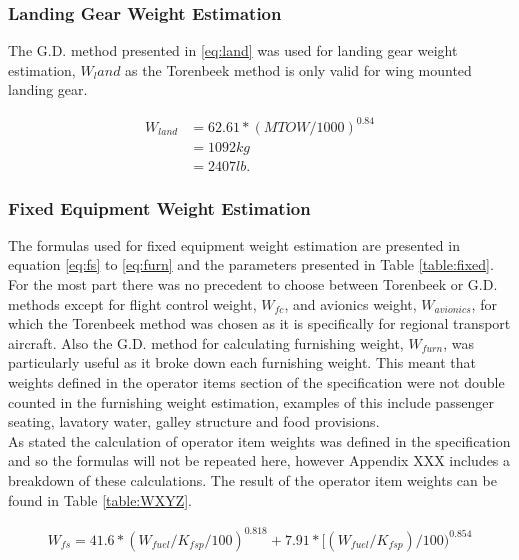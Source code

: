 \documentclass[11pt]{article}
\begin{document}
\subsubsection{Landing Gear Weight Estimation}

The G.D. method presented in \ref{eq:land} was used for landing gear weight estimation, $W_land$ as the Torenbeek method is only valid for wing mounted landing gear. 

\begin{equation} \label{eq:land} %
\begin{split} 
W_{land} &= 62.61*(MTOW/1000)^{0.84} \\
& = 1092kg \\
&= 2407lb.
\end{split}
\end{equation}

\subsubsection{Fixed Equipment Weight Estimation}

The formulas used for fixed equipment weight estimation are presented in equation \ref{eq:fs} to \ref{eq:furn} and the parameters presented in Table \ref{table:fixed}. For the most part there was no precedent to choose between Torenbeek or G.D. methods except for flight control weight, $W_{fc}$, and avionics weight, $W_{avionics}$, for which the Torenbeek method was chosen as it is specifically for regional transport aircraft. Also the G.D. method for calculating furnishing weight, $W_{furn}$, was particularly useful as it broke down each furnishing weight. This meant that weights defined in the operator items section of the specification \cite{spec} were not double counted in the furnishing weight estimation, examples of this include passenger seating, lavatory water, galley structure and food provisions. \\
As stated the calculation of operator item weights was defined in the specification and so the formulas will not be repeated here, however Appendix XXX includes a breakdown of these calculations. The result of the operator item weights can be found in Table \ref{table:WXYZ}.


\begin{equation} \label{eq:fs} %
\begin{split} 
W_{fs} =41.6*(W_{fuel}/K_{fsp}/100)^{0.818} + 7.91*[(W_{fuel}/K_{fsp})/100)^{0.854} 
\end{split}
\end{equation}
\end{document}
